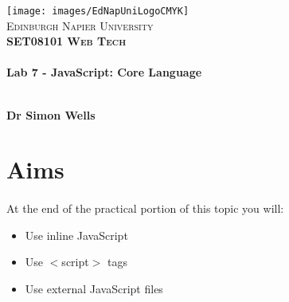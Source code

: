 \documentclass[10pt, a4paper, twosize]{article}
\begin{document}

\begin{titlepage}
\vspace*{5cm}
\begin{center}
\texttt{[image: images/EdNapUniLogoCMYK]}~\\[1cm]

\textsc{\Large Edinburgh Napier University}\\[1.5cm]

\textsc{\LARGE \bfseries SET08101 Web Tech}\\[0.5cm]

\hrulefill \\[0.4cm]
{\huge \bfseries Lab 7 - JavaScript: Core Language \\[0.4cm] }
\hrulefill \\[1.5cm]

\begin{minipage}{0.4\textwidth}
\begin{flushleft} \large
\textbf{Dr Simon Wells} \\
\end{flushleft}
\end{minipage}

\vfill

\end{center}
\end{titlepage}




%

\section{Aims}
\paragraph{} At the end of the practical portion of this topic you will:

\begin{itemize}
\item Use inline JavaScript
\item Use $<$script$>$ tags
\item Use external JavaScript files
\end{itemize}
\end{document}
